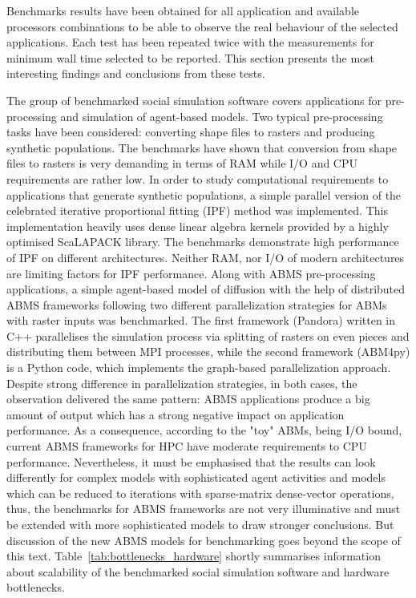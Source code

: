 Benchmarks results have been obtained for all application and available processors combinations to be able to observe the real behaviour of the selected applications.
Each test has been repeated twice with the measurements for minimum wall time selected to be reported. This section presents the most interesting findings and conclusions from these tests.%

The group of benchmarked social simulation software covers applications for pre-processing and simulation of agent-based models. Two typical pre-processing tasks have been considered: converting shape files to rasters and producing synthetic populations. The benchmarks have shown that conversion from shape files to rasters is very demanding in terms of RAM while I/O and CPU requirements are rather low. In order to study computational requirements to applications that generate synthetic populations, a simple parallel version of the celebrated iterative proportional fitting (IPF) method was implemented. This implementation heavily uses dense linear algebra kernels provided by a highly optimised ScaLAPACK library. The benchmarks demonstrate high performance of IPF on different architectures. Neither RAM, nor I/O of modern architectures are limiting factors for IPF performance. Along with ABMS pre-processing applications, a simple agent-based model of diffusion with the help of distributed ABMS frameworks following two different parallelization strategies for ABMs with raster inputs was benchmarked. The first framework (Pandora) written in C++ parallelises the simulation process via splitting of rasters on even pieces and distributing them between MPI processes, while the second framework (ABM4py) is a Python code, which implements the graph-based parallelization approach. Despite strong difference in parallelization strategies, in both cases, the observation delivered the same pattern: ABMS applications produce a big amount of output which has a strong negative impact on application performance. As a consequence, according to the "toy" ABMs, being I/O bound, current ABMS frameworks for HPC have moderate requirements to CPU performance. Nevertheless, it must be emphasised that the results can look differently for complex models with sophisticated agent activities and models which can be reduced to iterations with sparse-matrix dense-vector operations, thus, the benchmarks for ABMS frameworks are not very illuminative and must be extended with more sophisticated models to draw stronger conclusions. But discussion of the new ABMS models for benchmarking goes beyond the scope of this text. Table~\ref{tab:bottlenecks_hardware} shortly summarises information about scalability of the benchmarked social simulation software and hardware bottlenecks.

